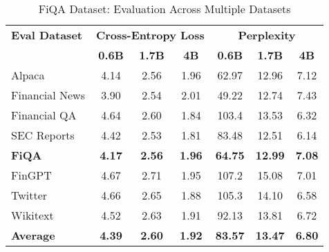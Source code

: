 
\begin{table}[htbp]
\centering
\caption[FiQA: Evaluation Results]{FiQA Dataset: Evaluation Across Multiple Datasets}
\label{tab:fiqa_results}
\begin{tabular}{l|ccc|ccc}
\hline
\textbf{Eval Dataset} & \multicolumn{3}{c|}{\textbf{Cross-Entropy Loss}} & \multicolumn{3}{c}{\textbf{Perplexity}} \\
\cline{2-4} \cline{5-7}
  & \textbf{0.6B} & \textbf{1.7B} & \textbf{4B} & \textbf{0.6B} & \textbf{1.7B} & \textbf{4B} \\
Alpaca & 4.14 & 2.56 & 1.96 & 62.97 & 12.96 & 7.12 \\
Financial News & 3.90 & 2.54 & 2.01 & 49.22 & 12.74 & 7.43 \\
Financial QA & 4.64 & 2.60 & 1.84 & 103.4 & 13.53 & 6.32 \\
SEC Reports & 4.42 & 2.53 & 1.81 & 83.48 & 12.51 & 6.14 \\
\textbf{FiQA} & \textbf{4.17} & \textbf{2.56} & \textbf{1.96} & \textbf{64.75} & \textbf{12.99} & \textbf{7.08} \\
FinGPT & 4.67 & 2.71 & 1.95 & 107.2 & 15.08 & 7.01 \\
Twitter & 4.66 & 2.65 & 1.88 & 105.3 & 14.10 & 6.58 \\
Wikitext & 4.52 & 2.63 & 1.91 & 92.13 & 13.81 & 6.72 \\
\hline
\textbf{Average} & \textbf{4.39} & \textbf{2.60} & \textbf{1.92} & \textbf{83.57} & \textbf{13.47} & \textbf{6.80} \\
\hline
\end{tabular}
\end{table}
